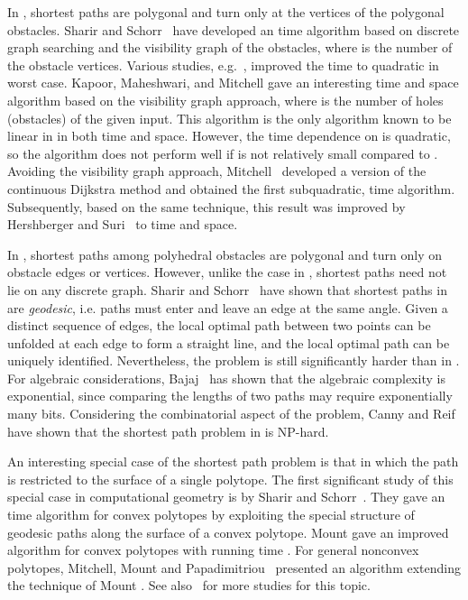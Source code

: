 \documentclass{llncs}
\begin{document}
In , shortest paths are polygonal and turn only at the vertices of the polygonal obstacles.
Sharir and Schorr~\cite{Sharir86} have developed an  time algorithm based on discrete
graph searching and the visibility graph of the obstacles, where  is the number of the obstacle
vertices. Various studies, e.g.~\cite{GM87,KM88,OW88}, improved the time to quadratic in worst case.
Kapoor, Maheshwari, and Mitchell \cite{KMM97} gave an interesting  time and 
space algorithm based on the visibility graph approach, where  is the number of holes (obstacles)
of the given input. This algorithm is the only algorithm known to be linear in  in both time and space.
However, the time dependence on  is quadratic, so the algorithm does not perform well if  is not
relatively small compared to . Avoiding the visibility graph approach, Mitchell~\cite{Mit96} developed
a version of the continuous Dijkstra method and obtained the first subquadratic, 
time algorithm. Subsequently, based on the same technique, this result was improved by Hershberger
and Suri~\cite{Her99} to  time and  space.

In , shortest paths among polyhedral obstacles are polygonal and turn only on obstacle
edges or vertices. However, unlike the case in , shortest paths need not lie on any
discrete graph. Sharir and Schorr~\cite{Sharir86} have shown that shortest paths in 
are {\it geodesic}, i.e. paths must enter and leave an edge at the same angle. Given a distinct sequence
of edges, the local optimal path between two points can be unfolded at each edge to form a straight line,
and the local optimal path can be uniquely identified. Nevertheless, the problem is still significantly
harder than in . For algebraic considerations, Bajaj~\cite{Bajaj85, Bajaj88} has shown
that the algebraic complexity is exponential, since comparing the lengths of two paths may require
exponentially many bits.
Considering the combinatorial aspect of the problem, Canny and Reif~\cite{reif} have shown that the
shortest path problem in  is NP-hard.

An interesting special case of the shortest path problem is that in which the path is
restricted to the surface of a single polytope.
The first significant study of this special case in computational
geometry  is by Sharir and Schorr~\cite{Sharir86}. They gave an  time
algorithm for convex polytopes by exploiting the special structure of geodesic paths along the surface
of a convex polytope. Mount \cite{Mount84} gave an improved algorithm for convex polytopes with running
time . For general nonconvex polytopes, Mitchell, Mount and Papadimitriou~\cite{Mit87}
presented an  algorithm extending the technique of Mount \cite{Mount84}.
See also~\cite{chen,agarwal,har-peled,sharir} for more studies for this topic.
\end{document}
